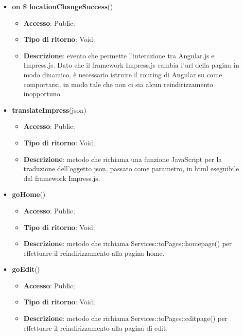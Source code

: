 {{\begin{itemize}
		\item \textbf{on \$ locationChangeSuccess}()
		\begin{itemize}
			\item \textbf{Accesso}: Public;
			\item \textbf{Tipo di ritorno}: Void;
			\item \textbf{Descrizione}: evento che permette l'interazione tra Angular.js e Impress.js. Dato che il framework Impress.js cambia l'url della pagina in modo dinamico, è necessario istruire il routing di Angular su come comportarsi, in modo tale che non ci sia alcun reindirizzamento inopportuno.
		\end{itemize}
		\item \textbf{translateImpress}(json)
		\begin{itemize}
			\item \textbf{Accesso}: Public;
			\item \textbf{Tipo di ritorno}: Void;
			\item \textbf{Descrizione}: metodo che richiama una funzione JavaScript per la traduzione dell'oggetto json, passato come parametro, in html eseguibile dal framework Impress.js.
		\end{itemize}
		\item \textbf{goHome}()
		\begin{itemize}
			\item \textbf{Accesso}: Public;
			\item \textbf{Tipo di ritorno}: Void;
			\item \textbf{Descrizione}: metodo che richiama Services::\-toPages::\-homepage() per effettuare il reindirizzamento alla pagina home.
		\end{itemize}
		\item \textbf{goEdit}()
		\begin{itemize}
			\item \textbf{Accesso}: Public;
			\item \textbf{Tipo di ritorno}: Void;
			\item \textbf{Descrizione}: metodo che richiama Services::\-toPages::\-editpage() per effettuare il reindirizzamento alla pagina di edit.
		\end{itemize}
	\end{itemize}
}
}
